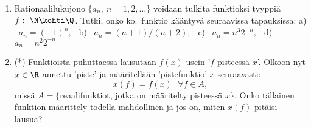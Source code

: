 \begin{enumerate}
\item
Rationaalilukujono $\{a_n,\ n=1,2,\ldots\}$ voidaan tulkita funktioksi tyyppiä $f:\ \N\kohti\Q$.
Tutki, onko ko.\ funktio kääntyvä seuraavissa tapauksissa: \newline
a) \ $a_n=(-1)^n,\ \ $ b) \ $a_n=(n+1)/(n+2),\ \ $ c) \ $a_n=n^3 2^{-n},\ \ $
d) \ $a_n=n^2 2^{-n}$

\item (*) 
Funktioista puhuttaessa lausutaan $f(x)$ usein '$f$ pisteessä $x$'. Olkoon nyt $x\in \R$ 
annettu 'piste' ja määritellään 'pistefunktio' $x$ seuraavasti:
\[
x(f)=f(x)\text{ }\forall f\in A,
\]
missä $A=\{$reaalifunktiot, jotka on määritelty pisteessä $x\}$. Onko tällainen 
funktion määrittely todella mahdollinen ja jos on, miten $x(f)$ pitäisi lausua?

\end{enumerate}
